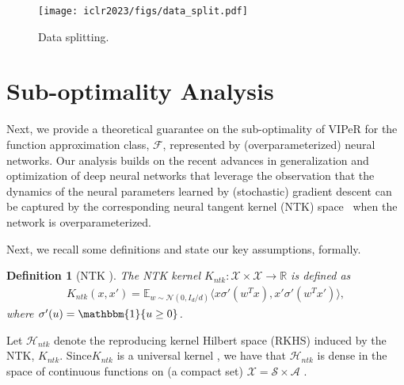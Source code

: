 \documentclass{article} \usepackage{iclr2023/iclr2023_conference,times}
\def\gA{{\mathcal{A}}}
\def\gS{{\mathcal{S}}}
\def\gX{{\mathcal{X}}}
\newtheorem{defn}{Definition}
\begin{document}
\begin{wrapfigure}{r}{0.24\textwidth}
    \vspace{-45pt}
    \centering
    \texttt{[image: iclr2023/figs/data\_split.pdf]}
    \vspace{-10pt}
    \caption{Data splitting.}
    \label{fig: data split}
    \vspace{-14pt}
\end{wrapfigure}






































%
 \section{Sub-optimality Analysis}
\label{section: subopt analysis}


Next, we provide a theoretical guarantee on the sub-optimality of VIPeR for the function approximation class, $\mathcal{F}$, represented by (overparameterized) neural networks. Our analysis builds on the recent advances in generalization and optimization of deep neural networks \citep{arora2019exact, allen2019convergence, hanin2019finite, cao2019generalization, belkin2021fit} that leverage the observation that the dynamics of the neural parameters learned by (stochastic) gradient descent can be captured by the corresponding neural tangent kernel (NTK) space~\citep{jacot2018neural} when the network is overparameterized. 


Next, we recall some definitions and state our key assumptions, formally. 






\begin{defn}[NTK \citep{jacot2018neural}]
The NTK kernel $K_{ntk}: \mathcal{X} \times \mathcal{X} \rightarrow \mathbb{R}$ is defined as
\begin{align*}
    K_{ntk}(x,x') = \mathbb{E}_{w \sim \mathcal{N}(0, I_d/d)} \langle x \sigma'(w^T x), x' \sigma'(w^T x') \rangle,
\end{align*}
{where $\sigma'(u) = \mathbbm{1}\{u \geq 0\}$.}
\label{definition: ntk}
\end{defn}
Let $\mathcal{H}_{ntk}$ denote the reproducing kernel Hilbert space (RKHS) induced by the NTK, $K_{ntk}$. {Since$K_{ntk}$ is a universal kernel \citep{DBLP:conf/iclr/JiTX20}, we have that $\mathcal{H}_{ntk}$ is dense in the space of continuous functions on (a compact set) $\gX = \gS \times \gA$ \citep{Rahimi08}.} 
\end{document}
